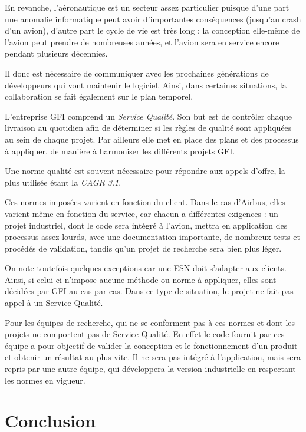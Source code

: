 En revanche, l'aéronautique est un secteur assez particulier puisque d'une part une anomalie informatique peut avoir d'importantes conséquences (jusqu'au crash d'un avion), d'autre part le cycle de vie est très long : la conception elle-même de l'avion peut prendre de nombreuses années, et l'avion sera en service encore pendant plusieurs décennies.

Il donc est nécessaire de communiquer avec les prochaines générations de développeurs qui vont maintenir le logiciel. Ainsi, dans certaines situations, la collaboration se fait également sur le plan temporel.

\begin{app}

L'entreprise GFI comprend un \textit{Service Qualité}. Son but est de contrôler chaque livraison au quotidien afin de déterminer si les règles de qualité sont appliquées au sein de chaque projet. Par ailleurs elle met en place des plans et des processus à appliquer, de manière à harmoniser les différents projets GFI.

Une norme qualité est souvent nécessaire pour répondre aux appels d'offre, la plus utilisée étant la \textit{CAGR 3.1}.

Ces normes imposées varient en fonction du client. Dans le cas d'Airbus, elles varient même en fonction du service, car chacun a différentes exigences : un projet industriel, dont le code sera intégré à l'avion, mettra en application des processus assez lourds, avec une documentation importante, de nombreux tests et procédés de validation, tandis qu'un projet de recherche sera bien plus léger.

On note toutefois quelques exceptions car une \gls{ESN} doit s'adapter aux clients. Ainsi, si celui-ci n'impose aucune méthode ou norme à appliquer, elles sont décidées par GFI au cas par cas. Dans ce type de situation, le projet ne fait pas appel à un Service Qualité.

Pour les équipes de recherche, qui ne se conforment pas à ces normes et dont les projets ne comportent pas de Service Qualité. En effet le code fournit par ces équipe a pour objectif de valider la conception et le fonctionnement d'un produit et obtenir un résultat au plus vite. Il ne sera pas intégré à l'application, mais sera repris par une autre équipe, qui développera la version industrielle en respectant les normes en vigueur.
\end{app}

\section{Conclusion}

